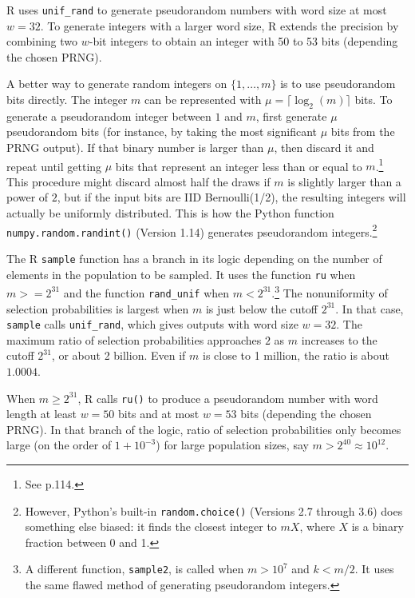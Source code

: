 \documentclass[12pt]{article}
\begin{document}
R uses \texttt{unif\_rand} to generate pseudorandom numbers with word size at most $w=32$.
To generate integers with a larger word size, R extends the precision by combining two $w$-bit integers to obtain an integer with 50 to 53 bits (depending the chosen PRNG). 

A better way to generate random integers on $\{1, \dots, m\}$ is to use pseudorandom bits directly. 
The integer $m$ can be represented with $\mu = \lceil \log_2(m) \rceil$ bits. 
To generate a pseudorandom integer between $1$ and $m$, first generate $\mu$ pseudorandom bits (for instance, by taking the most significant $\mu$ bits from the PRNG output).  
If that binary number is larger than $\mu$, then discard it and repeat until getting $\mu$ bits that represent an integer less than or equal to $m$.\footnote{%
   See \citet{knuth_art_1997} p.114.
}
This procedure might discard almost half the draws if $m$ is slightly larger than a power of $2$,
but if the input bits are IID Bernoulli(1/2), the resulting integers will actually be uniformly distributed.
This is how the Python function \texttt{numpy.random.randint()} (Version 1.14) generates pseudorandom integers.\footnote{%
However, Python's built-in \texttt{random.choice()} (Versions 2.7 through 3.6) does something else biased: it finds the closest integer to $mX$, where $X$ is a binary fraction between 0 and 1.
}

The R \texttt{sample} function has a branch in its logic depending on the number of elements
in the population to be sampled. 
It uses the function \texttt{ru} when $m >= 2^{31}$ and the function \texttt{rand\_unif} when $m < 2^{31}$.\footnote{
A different function, \texttt{sample2}, is called when $m > 10^7$ and $k < m/2$.
It uses the same flawed method of generating pseudorandom integers.
}
The nonuniformity of selection probabilities is largest when $m$ is just below the cutoff $2^{31}$. 
In that case, \texttt{sample} calls \texttt{unif\_rand}, which gives outputs with word size $w=32$. 
The maximum ratio of selection probabilities approaches $2$ as $m$ increases to the cutoff $2^{31}$, or about 2 billion. 
Even if $m$ is close to 1 million, the ratio is about $1.0004$.

When $m \ge 2^{31}$, R calls \texttt{ru()}  to produce a pseudorandom number with word length at least $w=50$ bits and at most $w=53$ bits (depending the chosen PRNG). 
In that branch of the logic, ratio of selection probabilities only becomes large (on the order of $1+10^{-3}$) for large population sizes, say $m > 2^{40} \approx 10^{12}$. 
\end{document}
